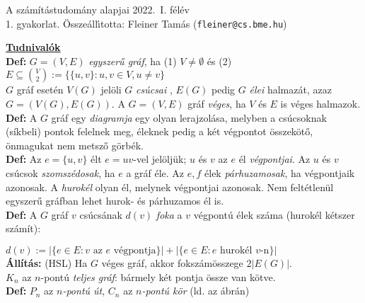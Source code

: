 \documentclass[a4paper]{article}
\newlength{\bek}
\newcommand{\0}{{\bf 0}}
\newcommand{\all}{{\bf Állítás:} }
\newcommand{\defi}{{\bf Def:} }
\begin{document}
\begin{center}
    {\huge A számítástudomány alapjai 2022.\ I. félév}\\ 
    {\large 1. gyakorlat.
    \"Ossze\'all\'\i totta: Fleiner Tam\'as ({\tt fleiner@cs.bme.hu})}
    \end{center}
    
    \vspace*{-.9em}
    \noindent
    {\bf\large\underline{Tudnivalók}}\\
    \defi $G=(V,E)$ \emph{egyszerű gráf}, ha \hfil(1) $V\ne\emptyset$
    és \hfil(2) $E\subseteq\binom V2:=\{\{u,v\}:u,v\in V, u\ne v\}$\\
    $G$ gráf esetén $V(G)$ jelöli $G$ \emph{csúcsai%
    }, $E(G)$
    pedig $G$ \emph{élei%
    } halmazát, azaz $G=(V(G),E(G))$. A $G=(V,E)$ %
    gráf \emph{véges}, ha $V$ és $E$ is véges halmazok.\\
    \defi A $G$ gráf egy \emph{diagramja} egy olyan lerajzolása, melyben a
    csúcsoknak (síkbeli) pontok felelnek meg, éleknek pedig a két végpontot
    összekötő, önmagukat nem metsző görbék.\\
    \defi Az $e=\{u,v\}$ élt $e=uv$-vel jelöljük; $u$ és $v$ az $e$
    él \emph{végpontjai}. Az $u$ és $v$ csúcsok \emph{szomszédosak}, ha $e$ a
    gráf éle.
    Az $e, f$ élek \emph{párhuzamosak}, ha végpontjaik azonosak.
    A \emph{hurokél} olyan él, melynek végpontjai azonosak. 
    Nem feltétlenül egyszerű gráfban lehet hurok- és párhuzamos él is.\\
    \defi A $G$ gráf $v$ csúcsának $d(v)$ \emph{foka} a $v$ végpontú élek száma
    (hurokél kétszer számít):\\
    \noindent
    \begin{minipage}[b]{11.3cm}
    $d(v):=|\{e\in E: v\mbox{ az  $e$ végpontja}\}|+|\{e\in E: e\mbox{ hurokél }
    v\mbox{-n}\}|$\\ 
    \all (HSL) Ha $G$ véges gráf, akkor fokszámösszege $2|E(G)|$.\\
    \hspace{\bek} $K_n$ az $n$-pontú \emph{teljes gráf}: bármely két pontja
    össze van kötve.\\
    \defi $P_n$ az \emph{$n$-pontú út}, $C_n$ az \emph{$n$-pontú kör}
    (ld. az ábrán)
    \end{minipage}~~
\end{document}
